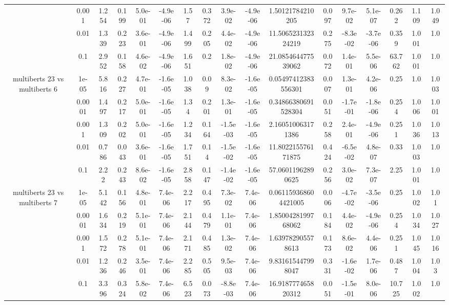 \begin{tabular}{|c|c|c|c|c|c|c|c|c|c|c|c|c|c|c|c|c|}
 & 0.001 & 1.254 & 0.199 & 5.0e-01 & -4.9e-06 & 1.57 & 0.372 & 3.9e-02 & -4.9e-06 & 1.50121784210205 & 0.097 & 9.7e-02 & 5.1e-07 & 0.262 & 1.109 & 1.049 \\
 & 0.01 & 1.339 & 0.223 & 3.6e-01 & -4.9e-06 & 1.499 & 0.205 & 4.4e-02 & -4.9e-06 & 11.506523132324219 & 0.275 & -8.3e-02 & -3.7e-06 & 0.359 & 1.001 & 1.0 \\
 & 0.1 & 2.952 & 0.158 & 4.6e-02 & -4.9e-06 & 1.651 & 0.2 & 1.8e-02 & -4.9e-06 & 21.085464477539062 & 0.072 & 1.4e-01 & 5.5e-06 & 63.762 & 1.001 & 1.0 \\
\hline
\multirow{5}{*}{multiberts 23 vs multiberts 6} & 1e-05 & 5.816 & 0.227 & 4.7e-01 & -1.6e-05 & 1.038 & 0.09 & 8.3e-02 & -1.6e-05 & 0.05497412383556301 & 0.007 & 1.3e-01 & 4.2e-06 & 0.25 & 1.0 & 1.003 \\
 & 0.0001 & 1.497 & 0.217 & 5.0e-01 & -1.6e-05 & 1.34 & 0.201 & 1.3e-01 & -1.6e-05 & 0.34866380691528304 & 0.051 & -1.7e-01 & -1.8e-06 & 0.254 & 1.006 & 1.001 \\
 & 0.001 & 1.309 & 0.202 & 5.0e-01 & -1.6e-05 & 1.234 & 0.164 & -1.5e-03 & -1.6e-05 & 2.160510063171386 & 0.258 & 2.4e-01 & -4.9e-06 & 0.251 & 1.036 & 1.013 \\
 & 0.01 & 0.786 & 0.043 & 3.6e-01 & -1.6e-05 & 1.751 & 0.14 & -1.5e-02 & -1.6e-05 & 11.802215576171875 & 0.424 & -6.5e-02 & 4.8e-07 & 0.33 & 1.003 & 1.0 \\
 & 0.1 & 2.22 & 0.243 & 8.6e-02 & -1.6e-05 & 2.858 & 0.147 & -1.4e-02 & -1.6e-05 & 57.06011962890625 & 0.256 & 3.0e-02 & 7.3e-07 & 2.25 & 1.001 & 1.0 \\
\hline
\multirow{5}{*}{multiberts 23 vs multiberts 7} & 1e-05 & 5.142 & 0.156 & 4.8e-01 & 7.4e-06 & 2.217 & 0.495 & 7.3e-02 & 7.4e-06 & 0.061159368604421005 & 0.006 & -4.7e-02 & -3.5e-06 & 0.25 & 1.002 & 1.01 \\
 & 0.0001 & 1.634 & 0.219 & 5.1e-01 & 7.4e-06 & 2.144 & 0.479 & 1.1e-01 & 7.4e-06 & 1.8500428199768062 & 0.184 & 4.4e-02 & -4.9e-06 & 0.254 & 1.034 & 1.027 \\
 & 0.001 & 1.572 & 0.278 & 5.1e-01 & 7.4e-06 & 2.171 & 0.485 & 1.3e-02 & 7.4e-06 & 1.639782905578613 & 0.173 & 8.6e-02 & 4.4e-06 & 0.251 & 1.045 & 1.016 \\
 & 0.01 & 1.236 & 0.246 & 3.5e-01 & 7.4e-06 & 2.285 & 0.505 & 9.5e-03 & 7.4e-06 & 9.831615447998047 & 0.331 & -1.6e-02 & 1.7e-06 & 0.487 & 1.004 & 1.03 \\
 & 0.1 & 3.396 & 0.324 & 5.8e-02 & 7.4e-06 & 6.523 & 0.073 & -8.8e-03 & 7.4e-06 & 16.918777465820312 & 0.051 & -1.5e-01 & 8.0e-06 & 10.725 & 1.002 & 1.0 \\

\end{tabular}
